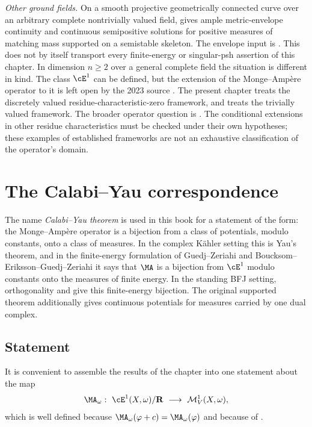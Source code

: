 \emph{Other ground fields.}  On a smooth projective geometrically
connected curve over an arbitrary complete nontrivially valued field,
 gives ample metric-envelope
continuity and continuous semipositive solutions for positive measures of
matching mass supported on a semistable skeleton.  The envelope input is
\cite[Theorem~1.1]{GJKM19}.  This does not by itself transport every
finite-energy or singular-psh assertion of this chapter.
In dimension $n\geq2$ over a
general complete field the situation is different in kind.  The class
$\cE^1$ can be defined, but the extension of the Monge--Amp\`ere operator
to it is left open by the 2023 source
\cite[Remark~4.4]{PS23Hybrid}.  The present chapter treats the discretely valued residue-characteristic-zero
framework, and  treats the trivially valued
framework.  The broader operator question is
.  The conditional extensions in other
residue characteristics must be checked under their own hypotheses;
these examples of established frameworks are not an exhaustive
classification of the operator's domain.

\section{The Calabi--Yau correspondence}
\label{sec:ch28-calabi-yau}

The name \emph{Calabi--Yau theorem} is used in this book for a statement of
the form: the Monge--Amp\`ere operator is a bijection from a class of
potentials, modulo constants, onto a class of measures.  In the complex
K\"ahler setting this is Yau's theorem, and in the finite-energy formulation
of Guedj--Zeriahi and Boucksom--Eriksson--Guedj--Zeriahi it says that
$\MA$ is a bijection from $\cE^1$ modulo constants onto the measures of
finite energy.  In the standing BFJ setting, orthogonality and
 give this finite-energy
bijection.  The original supported theorem additionally gives continuous
potentials for measures carried by one dual complex.

\subsection{Statement}
\label{sec:ch28-cy-statement}

It is convenient to assemble the results of the chapter into one statement
about the map
\begin{equation}
\label{eq:ch28-ma-map}
 \MA_\omega:\ \cE^1(X,\omega)/\mathbf R\ \longrightarrow\
 \mathcal M^1_V(X,\omega),
\end{equation}
which is well defined because $\MA_\omega(\varphi+c)=\MA_\omega(\varphi)$
and because of \Cref{prop:ch28-dual-energy-of-ma}.

